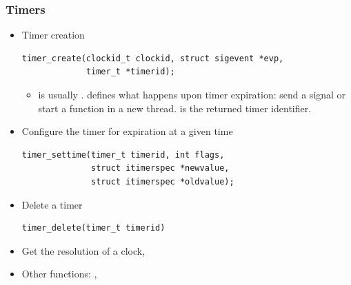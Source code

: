 \begin{frame}[fragile]
  \frametitle{Timers}
  \small
  \begin{itemize}
  \item Timer creation
    \begin{block}{}
\footnotesize
\begin{verbatim}
timer_create(clockid_t clockid, struct sigevent *evp,
             timer_t *timerid);
\end{verbatim}
\small
    \end{block}
    \begin{itemize}
    \item {} is usually
      .  defines what happens
      upon timer expiration: send a signal or start a function in a
      new thread.  is the returned timer identifier.
    \end{itemize}
  \item Configure the timer for expiration at a given time
    \begin{block}{}
\footnotesize
\begin{verbatim}
timer_settime(timer_t timerid, int flags,
              struct itimerspec *newvalue,
              struct itimerspec *oldvalue);
\end{verbatim}
\small
    \end{block}
  \item Delete a timer
    \begin{block}{}
\footnotesize
\begin{verbatim}
timer_delete(timer_t timerid)
\end{verbatim}
\small
    \end{block}
  \item Get the resolution of a clock, 
  \item Other functions: , 
  \end{itemize}
\end{frame}

